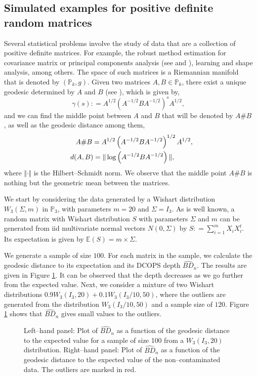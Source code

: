\documentclass[a4paper]{article}
\def\defeq{\mathrel{\mathop:}=}
\numberwithin{equation}{section}
\def\defeq{\mathrel{\mathop:}=}
\begin{document}
\subsection{Simulated examples for positive definite  random matrices}
Several statistical problems  involve the study of data that are a collection of positive definite matrices. For example, the robust method estimation  for covariance matrix or principal components analysis (see \cite{chen2017} and \cite{ggordaliza2017}), learning and shape analysis, among others.  The space of such matrices is a Riemannian manifold that is denoted by  $(\mathbb{P}_k,g)$. Given two matrices   $A,B \in \mathbb{P}_k$, there exist a unique geodesic determined by $A$ and $B$ (see \cite{moakher2005}), which is given by,
\begin{equation}
\gamma(s) \defeq  A ^{1/2} \left(A ^{-1/2} B A ^{-1/2}  \right) ^ s A ^{1/2}, 
\end{equation}  
and we can find the middle point between $A$ and $B$ that will be denoted by
 $A\#B$, as well as the geodesic distance among them,
\begin{align*}
A\#B = A ^{1/2} \left(A ^{-1/2} B A ^{-1/2}  \right) ^{1/2} A ^{1/2}, \\
&\hspace{-6.2 cm}d(A,B)= \Vert \log  \left(A ^{-1/2} B A ^{-1/2}  \right) \Vert,
\end{align*}
where  $\Vert \cdot \Vert$ is the Hilbert--Schmidt norm. We observe that the middle point $A\#B$ is nothing but the geometric mean between the matrices. 

We start by considering the data generated by a Wishart distribution $W_3(\Sigma, m)$ in  $\mathbb{P}_3$, with parameters $m=20$ and $\Sigma=I_3$. As is well known, a random matrix with Wishart distribution $S$ with parameters $\Sigma$ and $m$ can be generated from iid multivariate normal vectors $N(0,\Sigma)$ by $S \defeq \sum_{i=1}^m X_i X_i^t$. Its expectation is given by $\mathbb E(S)=m \times \Sigma$. 

We generate a sample of size $100$. For each matrix in the sample, we calculate the geodesic distance to its expectation and its DCOPS depth $\widehat{BD}_n$.  The results are given in Figure \ref{prof_matrices1}. It can be observed that the depth decreases as we go further from the expected value.  Next, we consider a mixture of two Wishart distributions 
$ 0.9  W_3(I_3,20) + 0.1  W_3(I_3/10,50)$, where the outliers are generated from the distribution $  W_3(I_3/10,50)$ and a sample size of $120$.
Figure \ref{prof_matrices1} shows that $\widehat{BD}_n$ gives small values to the outliers. 
\begin{figure}[!ht] 
\centering
{}
\caption{  Left--hand panel: Plot of $\widehat{BD}_n$ as a function of the geodesic distance to the expected value for a sample of size 100 from a $W_3(I_3,20)$ distribution. Right--hand panel: Plot of $\widehat{BD}_n$ as a function of the geodesic distance to the expected value of the non--contaminated data. The outliers are marked in red.} \label{prof_matrices1} 
\end{figure}
\newpage
\end{document}
